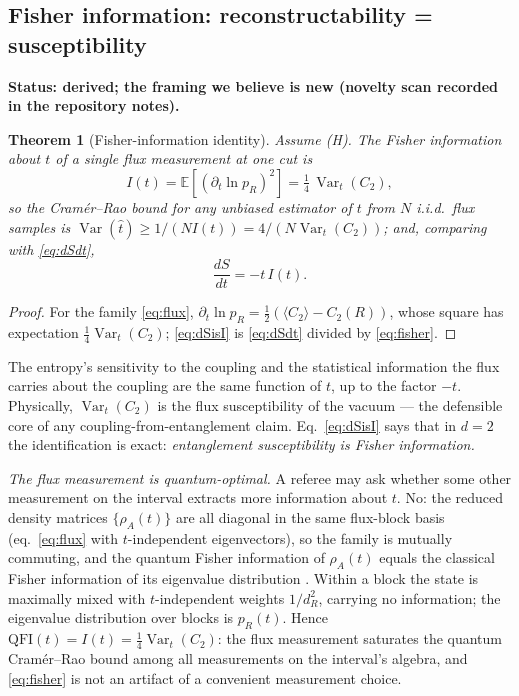 \documentclass[11pt]{article}
\newtheorem{theorem}{Theorem}
\theoremstyle{remark}
\theoremstyle{plain}
\newcommand{\Var}{\operatorname{Var}}
\begin{document}
\subsection{Fisher information: reconstructability = susceptibility}\label{sec:fisher}

\textbf{Status: derived; the framing we believe is new (novelty scan recorded in the repository notes).}

\begin{theorem}[Fisher-information identity]\label{thm:fisher}
Assume (H). The Fisher information about $t$ of a single flux measurement at one cut is
\begin{equation}\label{eq:fisher}
I(t) = \mathbb{E}\!\left[(\partial_t \ln p_R)^2\right] = \tfrac14\,\Var_t(C_2),
\end{equation}
so the Cram\'er--Rao bound for any unbiased estimator of $t$ from $N$ i.i.d.\ flux samples is $\Var(\hat t) \geq 1/(N I(t)) = 4/(N \Var_t(C_2))$; and, comparing with \eqref{eq:dSdt},
\begin{equation}\label{eq:dSisI}
\boxed{\;\frac{dS}{dt} = -t\, I(t).\;}
\end{equation}
\end{theorem}

\begin{proof}
For the family \eqref{eq:flux}, $\partial_t \ln p_R = \tfrac12(\langle C_2\rangle - C_2(R))$, whose square has expectation $\tfrac14\Var_t(C_2)$; \eqref{eq:dSisI} is \eqref{eq:dSdt} divided by \eqref{eq:fisher}.
\end{proof}

The entropy's sensitivity to the coupling and the statistical information the flux carries about the coupling are the same function of $t$, up to the factor $-t$. Physically, $\Var_t(C_2)$ is the flux susceptibility of the vacuum --- the defensible core of any coupling-from-entanglement claim. Eq.~\eqref{eq:dSisI} says that in $d = 2$ the identification is exact: \emph{entanglement susceptibility is Fisher information.}

\emph{The flux measurement is quantum-optimal.} A referee may ask whether some other measurement on the interval extracts more information about $t$. No: the reduced density matrices $\{\rho_A(t)\}$ are all diagonal in the same flux-block basis (eq.~\eqref{eq:flux} with $t$-independent eigenvectors), so the family is mutually commuting, and the quantum Fisher information of $\rho_A(t)$ equals the classical Fisher information of its eigenvalue distribution \cite{BC94}. Within a block the state is maximally mixed with $t$-independent weights $1/d_R^2$, carrying no information; the eigenvalue distribution over blocks is $p_R(t)$. Hence $\mathrm{QFI}(t) = I(t) = \tfrac14\Var_t(C_2)$: the flux measurement saturates the quantum Cram\'er--Rao bound among all measurements on the interval's algebra, and \eqref{eq:fisher} is not an artifact of a convenient measurement choice.
\end{document}
